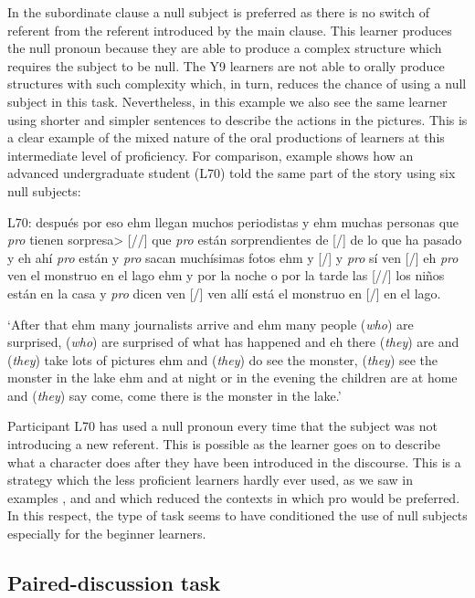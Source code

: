 \documentclass[output=paper]{langscibook}
\begin{document}
In the subordinate clause a null subject is preferred as there is no switch of referent from the referent introduced by the main clause. This learner produces the null pronoun because they are able to produce a complex structure which requires the subject to be null. The Y9 learners are not able to orally produce structures with such complexity which, in turn, reduces the chance of using a null subject in this task. Nevertheless, in this example we also see the same learner using shorter and simpler sentences to describe the actions in the pictures. This is a clear example of the mixed nature of the oral productions of learners at this intermediate level of proficiency. For comparison, example  shows how an advanced undergraduate student (L70) told the same part of the story using six null subjects:


\ea%
    \label{ex:dominguez:17}
         L70: después por eso ehm llegan muchos periodistas y ehm muchas personas que \textit{pro} tienen sorpresa> [//] que \textit{pro} están sorprendientes de [/] de lo que ha pasado y eh ahí \textit{pro} están y \textit{pro} sacan muchí\-simas fotos ehm y [/] y \textit{pro} sí ven [/] eh \textit{pro} ven el monstruo en el lago ehm y por la noche o por la tarde las [//] los niños están en la casa y \textit{pro} dicen ven [/] ven allí está el monstruo en [/] en el lago.

         \glt `After that ehm many journalists arrive and ehm many people (\textit{who}) are surprised, (\textit{who}) are surprised of what has happened and eh there (\textit{they}) are and (\textit{they}) take lots of pictures ehm and (\textit{they}) do see the monster, (\textit{they}) see the monster in the lake ehm and at night or in the evening the children are at home and (\textit{they}) say come, come there is the monster in the lake.'
\z

Participant L70 has used a null pronoun every time that the subject was not introducing a new referent. This is possible as the learner goes on to describe what a character does after they have been introduced in the discourse. This is a strategy which the less proficient learners hardly ever used, as we saw in examples ,  and  and which reduced the contexts in which pro would be preferred. In this respect, the type of task seems to have conditioned the use of null subjects especially for the beginner learners.

\subsection{Paired-discussion task}
\end{document}
